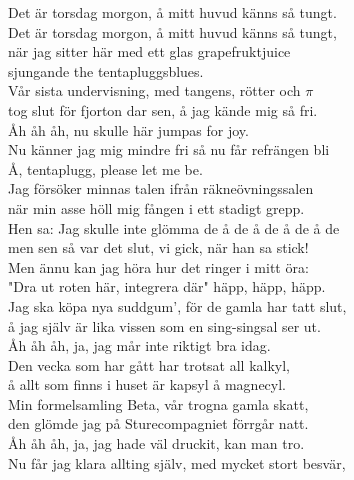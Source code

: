 \documentclass[a6paper, 10pt, twoside]{article}
\begin{document}
\noindent
\begin{center}
\end{center}
\begin{lyrics}
Det är torsdag morgon, å mitt huvud känns så tungt. \\
Det är torsdag morgon, å mitt huvud känns så tungt, \\
när jag sitter här med ett glas grapefruktjuice \\
sjungande the tentapluggsblues. 
\vspace{5pt} \\
Vår sista undervisning, med tangens, rötter och $\pi$ \\
tog slut för fjorton dar sen, å jag kände mig så fri. \\
Åh åh åh, nu skulle här jumpas for joy. \\
Nu känner jag mig mindre fri så nu får refrängen bli \\
Å, tentaplugg, please let me be. 
\vspace{5pt} \\
Jag försöker minnas talen ifrån räkneövningssalen \\
när min asse höll mig fången i ett stadigt grepp. \\
Hen sa: Jag skulle inte glömma de å de å de å de å de \\
men sen så var det slut, vi gick, när han sa stick! \\
Men ännu kan jag höra hur det ringer i mitt öra: \\
"Dra ut roten här, integrera där" häpp, häpp, häpp. 
\vspace{5pt} \\
Jag ska köpa nya suddgum', för de gamla har tatt slut, \\
å jag själv är lika vissen som en sing-singsal ser ut. \\
Åh åh åh, ja, jag mår inte riktigt bra idag. \\
Den vecka som har gått har trotsat all kalkyl, \\
å allt som finns i huset är kapsyl å magnecyl. 
\vspace{5pt} \\
Min formelsamling Beta, vår trogna gamla skatt, \\
den glömde jag på Sturecompagniet förrgår natt. \\
Åh åh åh, ja, jag hade väl druckit, kan man tro. \\
Nu får jag klara allting själv, med mycket stort besvär, \\

\end{lyrics}
\end{document}
